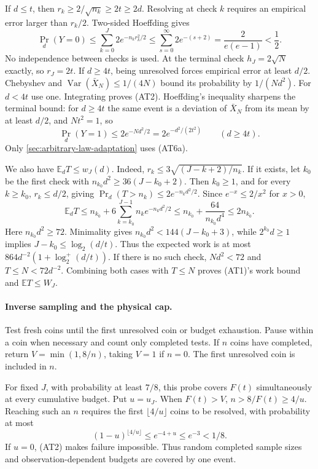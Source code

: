 If $d\le t$, then $r_k\ge2/\sqrt{n_k}\ge2t\ge2d$. Resolving at check $k$
requires an empirical error larger than $r_k/2$. Two-sided Hoeffding gives
\[
 \Pr_d(Y=0)\le\sum_{k=0}^J2e^{-n_kr_k^2/2}
 \le\sum_{s=0}^{\infty}2e^{-(s+2)}
 =\frac{2}{e(e-1)}<\frac12.
 \tag{AT6}
\]
No independence between checks is used. At the terminal check $h_J=2\sqrt N$
exactly, so $r_J=2t$. If $d\ge4t$, being unresolved forces empirical error
at least $d/2$. Chebyshev and $\operatorname{Var}(\bar X_N)\le1/(4N)$ bound
its probability by $1/(Nd^2)$. For $d<4t$ use one. Integrating proves (AT2).
Hoeffding's inequality sharpens the terminal bound: for $d\ge4t$ the same
event is a deviation of $\bar X_N$ from its mean by at least $d/2$, and
$Nt^2=1$, so
\[
 \Pr_d(Y=1)\le2e^{-Nd^2/2}=2e^{-d^2/(2t^2)}\qquad(d\ge4t).
 \tag{AT6a}
\]
Only \cref{sec:arbitrary-law-adaptation} uses (AT6a).

We also have $\mathbb E_dT\le w_J(d)$. Indeed,
$r_k\le3\sqrt{(J-k+2)/n_k}$. If it exists, let $k_0$ be the first check with
$n_{k_0}d^2\ge36(J-k_0+2)$. Then $k_0\ge1$, and for every $k\ge k_0$,
$r_k\le d/2$, giving $\Pr_d(T>n_k)\le2e^{-n_kd^2/2}$. Since
$e^{-x}\le2/x^2$ for $x>0$,
\[
 \mathbb E_dT
 \le n_{k_0}+6\sum_{k=k_0}^{J-1}n_ke^{-n_kd^2/2}
 \le n_{k_0}+\frac{64}{n_{k_0}d^4}\le2n_{k_0}.
 \tag{AT7}
\]
Here $n_{k_0}d^2\ge72$. Minimality gives
$n_{k_0}d^2<144(J-k_0+3)$, while $2^{k_0}d\ge1$ implies
$J-k_0\le\log_2(d/t)$. Thus the expected work is at most
$864d^{-2}(1+\log_2^+(d/t))$. If there is no such check, $Nd^2<72$ and
$T\le N<72d^{-2}$. Combining both cases with $T\le N$ proves (AT1)'s
work bound and $\mathbb ET\le W_J$.

\paragraph{Inverse sampling and the physical cap.}
Test fresh coins until the first unresolved coin or budget exhaustion.
Pause within a coin when necessary and count only completed tests. If $n$
coins have completed, return $V=\min(1,8/n)$, taking $V=1$ if $n=0$.
The first unresolved coin is included in $n$.

For fixed $J$, with probability at least $7/8$, this probe covers $F(t)$
simultaneously at every cumulative budget. Put $u=u_J$. When $F(t)>V$,
$n>8/F(t)\ge4/u$. Reaching such an $n$ requires the first
$\lfloor4/u\rfloor$ coins to be resolved, with probability at most
\[
 (1-u)^{\lfloor4/u\rfloor}\le e^{-4+u}\le e^{-3}<1/8.
 \tag{AT8}
\]
If $u=0$, (AT2) makes failure impossible. Thus random completed sample sizes
and observation-dependent budgets are covered by one event.

